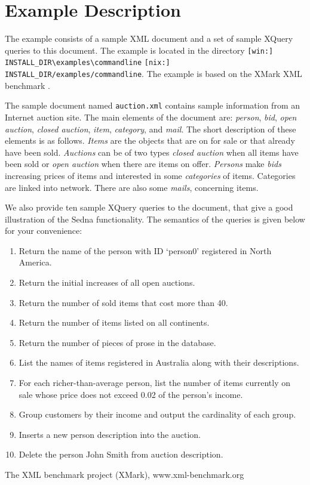 \documentclass[a4paper,12pt]{article}
\begin{document}
\section{Example Description}
\label{sec:example-description}
The example consists of a sample XML document and a set of sample XQuery queries to this document. The example is located in the directory \verb![win:] INSTALL_DIR\examples\commandline! \verb![nix:] INSTALL_DIR/examples/commandline!. The example is based on the XMark XML benchmark \cite{xmark}.

The sample document named \verb!auction.xml! contains sample information from an Internet auction site. The main elements of the document are: \emph{person}, \emph{bid}, \emph{open auction}, \emph{closed auction}, \emph{item}, \emph{category}, and \emph{mail}. The short description of these elements is as follows. \emph{Items} are the objects that are on for sale or that already have been sold. \emph{Auctions} can be of two types \emph{closed auction} when all items have been sold or \emph{open auction} when there are items on offer. \emph{Persons} make \emph{bids} increasing prices of items and interested in some \emph{categories} of items. Categories are linked into network. There are also some \emph{mails}, concerning items. 

We also provide ten sample XQuery queries to the document, that give a good illustration of the Sedna functionality. The semantics of the queries is given below for your convenience:
\begin{enumerate}
\item Return the name of the person with ID `person0' registered in North
 America.
\item Return the initial increases of all open auctions.
\item Return the number of sold items that cost more than 40.
\item Return the number of items listed on all continents.
\item Return the number of pieces of prose in the database.
\item List the names of items registered in Australia along with their
 descriptions.
\item For each richer-than-average person, list the number of items currently
 on sale whose price does not exceed 0.02 of the person's income.
\item Group customers by their income and output the cardinality of each group.
\item Inserts a new person description into the auction.
\item Delete the person John Smith from auction description.
\end{enumerate}

\begin{thebibliography}{9}
 The XML benchmark project (XMark), www.xml-benchmark.org
\end{thebibliography}
\end{document}
